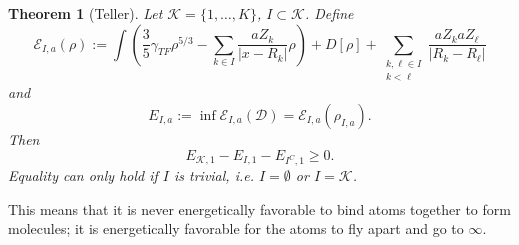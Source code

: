 \documentclass[11pt]{amsart}
\newtheorem{thm}{Theorem}
\theoremstyle{definition}
\theoremstyle{definition}
\theoremstyle{definition}
\numberwithin{equation}{section}
\begin{document}
\begin{thm}[Teller]
Let $\mathcal{K}=\{1,\ldots,K\}$, $I\subset\mathcal{K}$. Define
\begin{equation}
\mathcal{E}_{I,a}(\rho):=\int\left(\frac{3}{5}\gamma_{TF}\rho^{5/3}-\sum_{k\in I}\frac{aZ_k}{|x-R_k|}\rho\right)+D[\rho]+\sum_{\substack{k,\ell\in I\\k<\ell}}\frac{aZ_k aZ_\ell}{|R_k-R_\ell|}
\end{equation}
and
\begin{equation*}
E_{I,a}:=\inf \mathcal{E}_{I,a}(\mathcal{D})=\mathcal{E}_{I,a}(\rho_{I,a}).
\end{equation*}
Then
\begin{equation}
E_{\mathcal{K},1}-E_{I,1}-E_{I^C,1}\ge0.
\end{equation}
Equality can only hold if $I$ is trivial, i.e. $I=\emptyset$ or $I=\mathcal{K}$.
\end{thm}
This means that it is never energetically favorable to bind atoms together to form molecules; it is energetically favorable for the atoms to fly apart and go to $\infty$.
\end{document}
